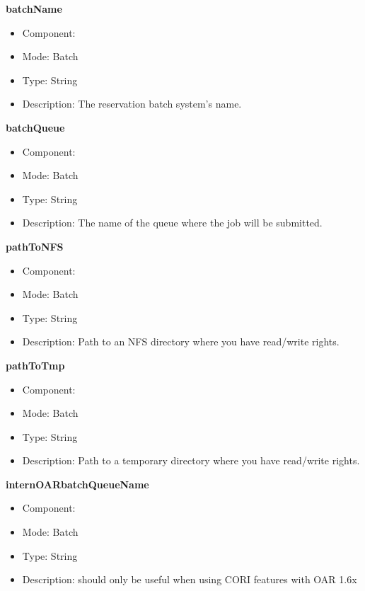 \begin{description}
\item{\bf{batchName}}
  \begin{itemize}
  \item Component: \sed
  \item Mode: Batch
  \item Type: String
  \item Description: The reservation batch system's name.
  \end{itemize}

\item{\bf{batchQueue}}
  \begin{itemize}
  \item Component: \sed
  \item Mode: Batch
  \item Type: String
  \item Description: The name of the queue where the job will be submitted.
  \end{itemize}

\item{\bf{pathToNFS}}
  \begin{itemize}
  \item Component: \sed
  \item Mode: Batch
  \item Type: String
  \item Description: Path to an NFS directory where you have read/write rights.
  \end{itemize}

\item{\bf{pathToTmp}}
  \begin{itemize}
  \item Component: \sed
  \item Mode: Batch
  \item Type: String
  \item Description: Path to a temporary directory where you have
    read/write rights.
  \end{itemize}

\item{\bf{internOARbatchQueueName}}
  \begin{itemize}
  \item Component: \sed
  \item Mode: Batch
  \item Type: String
  \item Description: should only be useful when using CORI features
    with OAR 1.6x
  \end{itemize}


\end{description}
